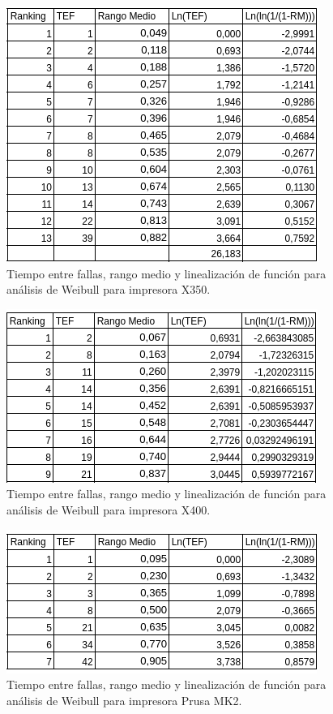 \begin{figure}[H]
\centering
\includegraphics[scale=0.8]{images/linweibx350.png}
\caption{Tiempo entre fallas, rango medio y linealización de función para análisis de Weibull para impresora X350.}
\label{linweibx350}
\end{figure}


\begin{figure}[H]
\centering
\includegraphics[scale=0.8]{images/linweibx400.png}
\caption{Tiempo entre fallas, rango medio y linealización de función para análisis de Weibull para impresora X400.}
\label{linweibx400}
\end{figure}


\begin{figure}[H]
\centering
\includegraphics[scale=0.8]{images/linweibmk2.png}
\caption{Tiempo entre fallas, rango medio y linealización de función para análisis de Weibull para impresora Prusa MK2.}
\label{linweibmk2}
\end{figure}



